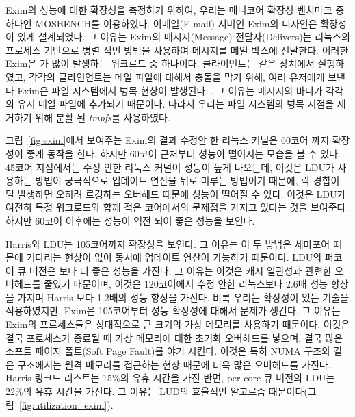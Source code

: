 Exim의 성능에 대한 확장성을 측정하기 위하여, 우리는 매니코어 확장성 벤치마크 중 하나인 MOSBENCH를 이용하였다. 
이메일(E-mail) 서버인 Exim의 디자인은 확장성이 있게 설계되었다. 
그 이유는 Exim의 메시지(Message) 전달자(Delivers)는 리눅스의 프로세스 기반으로 
병렬 적인 방법을 사용하여 메시지를 메일 박스에 전달한다.
이러한 Exim은 가 많이 발생하는 워크로드 중 하나이다. 
클라이언트는 같은 장치에서 실행하였고, 
각각의 클라인언트는 메일 파일에 대해서 충돌을 막기 위해, 여러 유저에게 보낸다 
Exim은 파일 시스템에서 병목 현상이 발생된다~\cite{SilasBoydWickizer2010LinuxScales48}.
그 이유는 메시지의 바디가 각각의 유저 메일 파일에 추가되기 때문이다.
따라서 우리는 파일 시스템의 병목 지점을 제거하기 위해 분활 된 \textit{tmpfs}를 사용하였다. 

그림~\ref{fig:exim}에서 보여주는 Exim의 결과 수정안 한 리눅스 커널은 
60코어 까지 확장성이 좋게 동작을 한다. 
하지만 60코어 근처부터 성능이 떨어지는 모습을 볼 수 있다.
45코어 지점에서는 수정 안한 리눅스 커널이 성능이 높게 나오는데, 이것은 LDU가 사용하는 방법이 
궁극적으로 업데이트 연산을 뒤로 미루는 방법이기 때문에, 락 경합이 덜 발생하면 오히려 로깅하는 오버헤드 때문에 
성능이 떨어질 수 있다. 
이것은 LDU가 여전히 특정 워크로드와 함께 적은 코어에서의 문제점을 가지고 있다는 것을 보여준다.
하지만 60코어 이후에는 성능이 역전 되어 좋은 성능을 보인다. 

Harris와 LDU는 105코어까지 확장성을 보인다. 
그 이유는 이 두 방법은 세마포어 때문에 기다리는 현상이 없이 동시에 업데이트 연산이 가능하기 때문이다. 
LDU의 퍼코어 큐 버전은 보다 더 좋은 성능을 가진다.
그 이유는 이것은 캐시 일관성과 관련한 오버헤드를 줄였기 때문이며, 이것은 120코어에서 수정 안한 
리눅스보다 2.6배 성능 향상을 가지며 Harris 보다 1.2배의 성능 향상을 가진다.
비록 우리는 확장성이 있는 기술을 적용하였지만, Exim은 105코어부터 성능 확장성에 대해서 문제가 생긴다.
그 이유는 Exim의 프로세스들은 상대적으로 큰 크기의 가상 메모리를 사용하기 때문이다.
이것은 결국 프로세스가 종료될 때 가상 메모리에 대한 초기화 오버헤드를 낳으며,
결국 많은 소프트 페이지 폴트(Soft Page Fault)를 야기 시킨다. 
이것은 특히 NUMA 구조와 같은 구조에서는 원격 메모리를 접근하는 현상 때문에 더욱 많은 오버헤드를 가진다.
Harris 링크드 리스트는 15\%의 유휴 시간을 가진 반면, per-core 큐 버전의 LDU는 22\%의 유휴 시간을 가진다.
그 이유는 LUD의 효율적인 알고르즘 때문이다(그림~\ref{fig:utilization_exim}).

